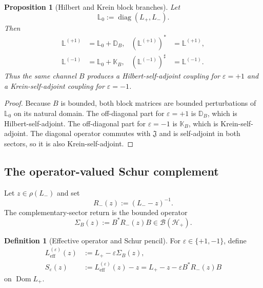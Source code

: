 \documentclass[11pt,reqno]{scrartcl}
\newcommand{\scrHp}{\mathscr H_{+}}
\newcommand{\fundJ}{\mathfrak J}
\newcommand{\DB}{\mathbb D}
\newcommand{\KB}{\mathbb K}
\DeclareMathOperator{\Dom}{Dom}
\DeclareMathOperator{\diag}{diag}
\theoremstyle{plain}
\newtheorem{proposition}[proposition]{Proposition}
\theoremstyle{definition}
\newtheorem{definition}[definition]{Definition}
\theoremstyle{remark}
\begin{document}
\begin{proposition}[Hilbert and Krein block branches]
\label{prop:block-branches}
Let
\begin{equation}
  \mathbb L_0:=\diag(L_+,L_-).
\end{equation}
Then
\begin{align}
  \mathbb L^{(+1)}
  &=\mathbb L_0+\DB_B,
  &
  (\mathbb L^{(+1)})^*&=\mathbb L^{(+1)},
  \label{eq:block-Hilbert-branch}\\
  \mathbb L^{(-1)}
  &=\mathbb L_0+\KB_B,
  &
  (\mathbb L^{(-1)})^\sharp&=\mathbb L^{(-1)}.
  \label{eq:block-Krein-branch}
\end{align}
Thus the same channel \(B\) produces a Hilbert-self-adjoint coupling for
\(\varepsilon=+1\) and a Krein-self-adjoint coupling for
\(\varepsilon=-1\).
\end{proposition}

\begin{proof}
Because \(B\) is bounded, both block matrices are bounded perturbations of
\(\mathbb L_0\) on its natural domain.  The off-diagonal part for
\(\varepsilon=+1\) is \(\DB_B\), which is Hilbert-self-adjoint.  The
off-diagonal part for \(\varepsilon=-1\) is \(\KB_B\), which is
Krein-self-adjoint.  The diagonal operator commutes with \(\fundJ\) and is
self-adjoint in both sectors, so it is also Krein-self-adjoint.
\end{proof}

\subsection{The operator-valued Schur complement}

Let \(z\in\rho(L_-)\) and set
\begin{equation}
  R_-(z):=(L_--z)^{-1}.
  \label{eq:Rminus}
\end{equation}
The complementary-sector return is the bounded operator
\begin{equation}
  \Sigma_B(z):=B^*R_-(z)B
  \in\mathcal B(\scrHp).
  \label{eq:self-energy}
\end{equation}

\begin{definition}[Effective operator and Schur pencil]
\label{def:effective-operator}
For \(\varepsilon\in\{+1,-1\}\), define
\begin{align}
  L_{\mathrm{eff}}^{(\varepsilon)}(z)
  &:=L_+-\varepsilon\Sigma_B(z),
  \label{eq:effective-operator}\\
  S_\varepsilon(z)
  &:=L_{\mathrm{eff}}^{(\varepsilon)}(z)-z
  =L_+-z-\varepsilon B^*R_-(z)B
  \label{eq:Schur-pencil}
\end{align}
on \(\Dom L_+\).
\end{definition}
\end{document}
